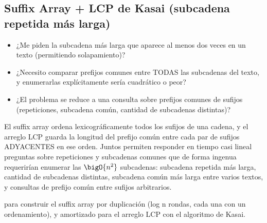 \subsection{Suffix Array + LCP de Kasai (subcadena repetida más larga)}


\begin{itemize}
\item ¿Me piden la subcadena más larga que aparece al menos dos veces en un texto (permitiendo solapamiento)?
\item ¿Necesito comparar prefijos comunes entre TODAS las subcadenas del texto, y enumerarlas explícitamente sería cuadrático o peor?
\item ¿El problema se reduce a una consulta sobre prefijos comunes de sufijos (repeticiones, subcadena común, cantidad de subcadenas distintas)?
\end{itemize}

 El suffix array ordena lexicográficamente todos los sufijos de una cadena, y el arreglo LCP guarda la longitud del prefijo común entre cada par de sufijos ADYACENTES en ese orden. Juntos permiten responder en tiempo casi lineal preguntas sobre repeticiones y subcadenas comunes que de forma ingenua requerirían enumerar las $\bigO{n^2}$ subcadenas: subcadena repetida más larga, cantidad de subcadenas distintas, subcadena común más larga entre varios textos, y consultas de prefijo común entre sufijos arbitrarios.

  para construir el suffix array por duplicación (log n rondas, cada una con un ordenamiento), y  amortizado para el arreglo LCP con el algoritmo de Kasai.

